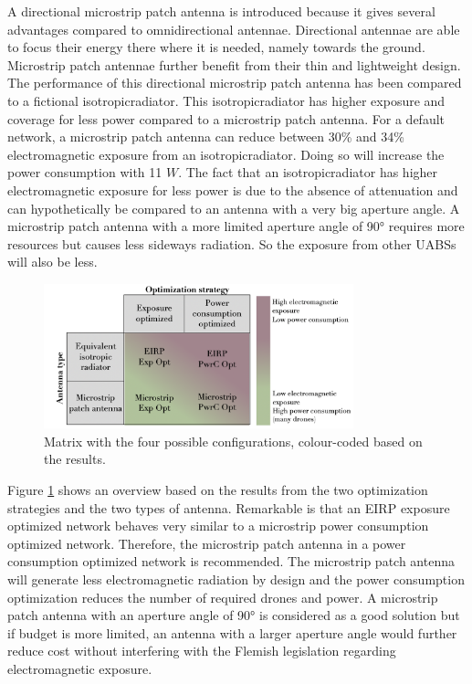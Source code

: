 A directional microstrip patch antenna is introduced because it gives several advantages compared to omnidirectional antennae.
Directional antennae are able to focus their energy there where it is needed, namely towards the ground. Microstrip patch antennae 
further benefit from their thin and lightweight design. The performance 
of this directional microstrip patch antenna has been compared to a 
fictional \gls{isotropicradiator}.
This \gls{isotropicradiator} has higher exposure and coverage for less power compared to a microstrip patch antenna.
For a default network, a microstrip patch antenna can reduce between 30\% and 34\% electromagnetic exposure 
from an \gls{isotropicradiator}. Doing so will increase the power consumption with 11 $W$.
The fact that an \gls{isotropicradiator} has higher electromagnetic exposure for less power  is due to the absence of 
attenuation and can hypothetically be compared to an antenna with a very big aperture angle.
A microstrip patch antenna with a more limited aperture angle of \ang{90} requires more resources but 
causes less sideways radiation. So the exposure from other \gls{UABS}s will also be less.

\begin{figure}[hb!]
\centering
  \includegraphics[width=0.8\textwidth]{../images/fourCasesMatrixSol.png}
  \caption{Matrix with the four possible configurations, colour-coded based on the results.}
  \label{fig:resultIllustration}
\end{figure}

Figure \ref{fig:resultIllustration} shows an overview based on the results from the two optimization strategies and the two types of antenna.
Remarkable is that an \gls{EIRP} exposure optimized network behaves very similar to a microstrip power consumption optimized network.
Therefore, the microstrip patch antenna in a power consumption optimized network is recommended. 
The microstrip patch antenna will generate less electromagnetic radiation by design and
 the power consumption optimization reduces the number of required drones and power. A microstrip patch antenna with an aperture 
 angle of \ang{90} is considered as a good solution but if budget is more limited, an antenna with a larger aperture angle 
 would further reduce cost without interfering with the Flemish legislation regarding electromagnetic exposure.


